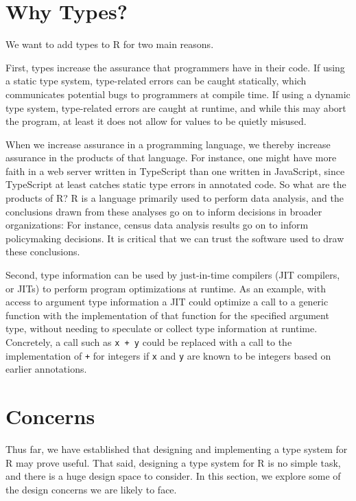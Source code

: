 \documentclass[sigplan,10pt,review,anonymous]{acmart}\settopmatter{printfolios=true,printccs=false,printacmref=false}
\begin{document}
%
%
%
%
\section{Why Types?}

We want to add types to R for two main reasons.

First, types increase the assurance that programmers have in their code.
If using a static type system, type-related errors can be caught statically, which communicates potential bugs to programmers at compile time.
If using a dynamic type system, type-related errors are caught at runtime, and while this may abort the program, at least it does not allow for values to be quietly misused.

When we increase assurance in a programming language, we thereby increase assurance in the products of that language.
For instance, one might have more faith in a web server written in TypeScript than one written in JavaScript, since TypeScript at least catches static type errors in annotated code.
So what are the products of R?
R is a language primarily used to perform data analysis, and the conclusions drawn from these analyses go on to inform decisions in broader organizations:
For instance, census data analysis results go on to inform policymaking decisions.
It is critical that we can trust the software used to draw these conclusions.

Second, type information can be used by just-in-time compilers (JIT compilers, or JITs) to perform program optimizations at runtime.
As an example, with access to argument type information a JIT could optimize a call to a generic function with the implementation of that function for the specified argument type, without needing to speculate or collect type information at runtime.
Concretely, a call such as {\tt x + y} could be replaced with a call to the implementation of {\tt +} for integers if {\tt x} and {\tt y} are known to be integers based on earlier annotations.



%
%
%
%
\section{Concerns}

Thus far, we have established that designing and implementing a type system for R may prove useful.
That said, designing a type system for R is no simple task, and there is a huge design space to consider.
In this section, we explore some of the design concerns we are likely to face.
\end{document}
